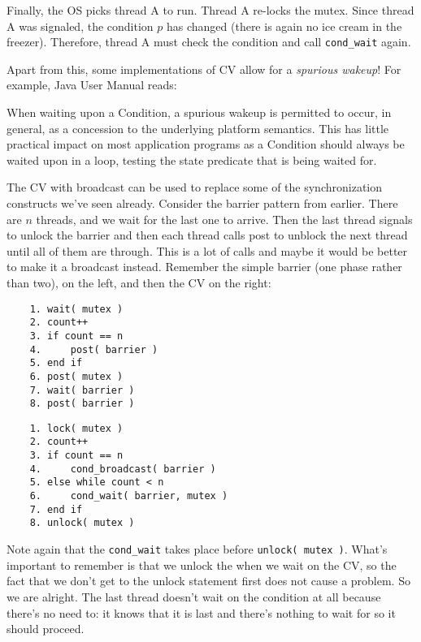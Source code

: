 Finally, the OS picks thread A to run.
Thread A re-locks the mutex.
Since thread A was signaled, the condition $p$ has changed (there is again no ice cream in the freezer).
Therefore, thread A must check the condition and call \texttt{cond\_wait} again.

Apart from this, some implementations of CV allow for a \emph{spurious wakeup}!
For example, Java User Manual reads:
\begin{displayquote}
	When waiting upon a Condition, a spurious wakeup is permitted to occur, in general, as a concession to the underlying platform semantics.
	This has little practical impact on most application programs as a Condition should always be waited upon in a loop, testing the state predicate that is being waited for.
\end{displayquote}

The CV with broadcast can be used to replace some of the synchronization constructs we've seen already. Consider the barrier pattern from earlier. There are $n$ threads, and we wait for the last one to arrive. Then the last thread signals to unlock the barrier and then each thread calls post to unblock the next thread until all of them are through. This is a lot of calls and maybe it would be better to make it a broadcast instead. Remember the simple barrier (one phase rather than two), on the left, and then the CV on the right:

\begin{multicols}{2}
	\begin{verbatim}
	1. wait( mutex )
	2. count++
	3. if count == n
	4.     post( barrier )
	5. end if
	6. post( mutex )
	7. wait( barrier )
	8. post( barrier )
  \end{verbatim}
	\columnbreak
	\begin{verbatim}
	1. lock( mutex )
	2. count++
	3. if count == n
	4.     cond_broadcast( barrier )
	5. else while count < n
	6.     cond_wait( barrier, mutex )
	7. end if
	8. unlock( mutex )
  \end{verbatim}
\end{multicols}

Note again that the \texttt{cond\_wait} takes place before \texttt{unlock( mutex )}. What's important to remember is that we unlock the  when we wait on the CV, so the fact that we don't get to the unlock statement first does not cause a problem. So we are alright. The last thread doesn't wait on the condition at all because there's no need to: it knows that it is last and there's nothing to wait for so it should proceed.

